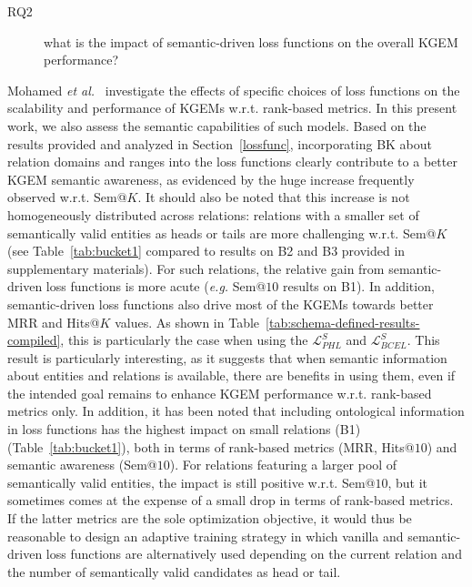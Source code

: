 \documentclass[letterpaper]{article} %
\begin{document}
\begin{description}
    \item[RQ2] what is the impact of semantic-driven loss functions on the overall KGEM performance?
\end{description}
Mohamed \textit{et al.}~\cite{mohamed2021} investigate the effects of specific choices of loss functions on the scalability and performance of KGEMs w.r.t. rank-based metrics. In this present work, we also assess the semantic capabilities of such models. Based on the results provided and analyzed in Section~\ref{lossfunc}, incorporating BK about relation domains and ranges into the loss functions clearly contribute to a better KGEM semantic awareness, as evidenced by the huge increase frequently observed w.r.t. Sem@$K$. It should also be noted that this increase is not homogeneously distributed across relations: relations with a smaller set of semantically valid entities as heads or tails are more challenging w.r.t. Sem@$K$ (see Table~\ref{tab:bucket1} compared to results on B2 and B3 provided in supplementary materials). For such relations, the relative gain from semantic-driven loss functions is more acute (\textit{e.g.} Sem@$10$ results on B1). In addition, semantic-driven loss functions also drive most of the KGEMs towards better MRR and Hits@$K$ values. As shown in Table~\ref{tab:schema-defined-results-compiled}, this is particularly the case when using the $\mathcal{L}^{S}_{PHL}$ and $\mathcal{L}^{S}_{BCEL}$. This result is particularly interesting, as it suggests that when semantic information about entities and relations is available, there are benefits in using them, even if the intended goal remains to enhance KGEM performance w.r.t. rank-based metrics only.
In addition, it has been noted that including ontological information in loss functions has the highest impact on small relations (B1) (Table~\ref{tab:bucket1}), both in terms of rank-based metrics (MRR, Hits@$10$) and semantic awareness (Sem@$10$). For relations featuring a larger pool of semantically valid entities, the impact is still positive w.r.t. Sem@$10$, but it sometimes comes at the expense of a small drop in terms of rank-based metrics. If the latter metrics are the sole optimization objective, it would thus be reasonable to design an adaptive training strategy in which vanilla and semantic-driven loss functions are alternatively used depending on the current relation and the number of semantically valid candidates as head or tail.
\end{document}
